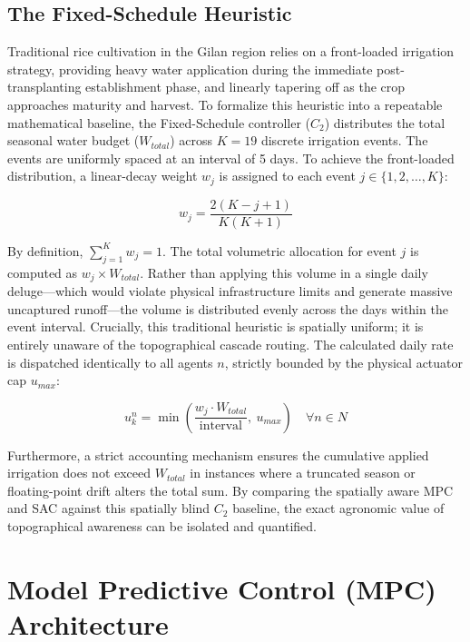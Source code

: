 \documentclass[11pt, a4paper]{article}
\begin{document}
\subsection{The Fixed-Schedule Heuristic}

Traditional rice cultivation in the Gilan region relies on a front-loaded irrigation strategy, providing heavy water application during the immediate post-transplanting establishment phase, and linearly tapering off as the crop approaches maturity and harvest. To formalize this heuristic into a repeatable mathematical baseline, the Fixed-Schedule controller ($C_2$) distributes the total seasonal water budget ($W_{total}$) across $K = 19$ discrete irrigation events. The events are uniformly spaced at an interval of 5 days. To achieve the front-loaded distribution, a linear-decay weight $w_j$ is assigned to each event $j \in \{1, 2, \dots, K\}$:

\begin{equation}
    w_j = \frac{2(K - j + 1)}{K(K+1)}
\end{equation}

By definition, $\sum_{j=1}^{K} w_j = 1$. The total volumetric allocation for event $j$ is computed as $w_j \times W_{total}$. Rather than applying this volume in a single daily deluge---which would violate physical infrastructure limits and generate massive uncaptured runoff---the volume is distributed evenly across the days within the event interval. Crucially, this traditional heuristic is spatially uniform; it is entirely unaware of the topographical cascade routing. The calculated daily rate is dispatched identically to all agents $n$, strictly bounded by the physical actuator cap $u_{max}$:

\begin{equation}
    u^n_k = \min \left( \frac{w_j \cdot W_{total}}{\text{interval}}, \ u_{max} \right) \quad \forall n \in N
\end{equation}

Furthermore, a strict accounting mechanism ensures the cumulative applied irrigation does not exceed $W_{total}$ in instances where a truncated season or floating-point drift alters the total sum. By comparing the spatially aware MPC and SAC against this spatially blind $C_2$ baseline, the exact agronomic value of topographical awareness can be isolated and quantified.

\section{Model Predictive Control (MPC) Architecture}
\end{document}
